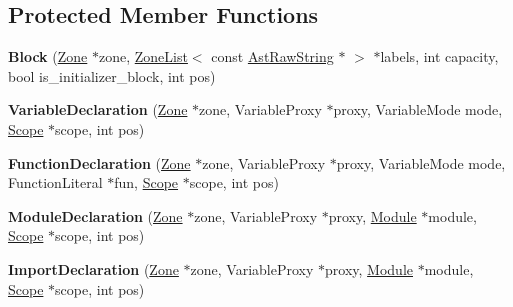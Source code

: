 \subsection*{Protected Member Functions}
\begin{DoxyCompactItemize}
\item 
\hypertarget{classv8_1_1internal_1_1_v8___f_i_n_a_l_acc7e400df298bd596cac6a4d9822c80e}{}{\bfseries Block} (\hyperlink{classv8_1_1internal_1_1_zone}{Zone} $\ast$zone, \hyperlink{classv8_1_1internal_1_1_zone_list}{Zone\+List}$<$ const \hyperlink{classv8_1_1internal_1_1_ast_raw_string}{Ast\+Raw\+String} $\ast$ $>$ $\ast$labels, int capacity, bool is\+\_\+initializer\+\_\+block, int pos)\label{classv8_1_1internal_1_1_v8___f_i_n_a_l_acc7e400df298bd596cac6a4d9822c80e}

\item 
\hypertarget{classv8_1_1internal_1_1_v8___f_i_n_a_l_a888518d28144f8c82fdc00d3b3196107}{}{\bfseries Variable\+Declaration} (\hyperlink{classv8_1_1internal_1_1_zone}{Zone} $\ast$zone, Variable\+Proxy $\ast$proxy, Variable\+Mode mode, \hyperlink{classv8_1_1internal_1_1_v8___f_i_n_a_l_1_1_scope}{Scope} $\ast$scope, int pos)\label{classv8_1_1internal_1_1_v8___f_i_n_a_l_a888518d28144f8c82fdc00d3b3196107}

\item 
\hypertarget{classv8_1_1internal_1_1_v8___f_i_n_a_l_aab1b086a344dc2765dda84f38d234d38}{}{\bfseries Function\+Declaration} (\hyperlink{classv8_1_1internal_1_1_zone}{Zone} $\ast$zone, Variable\+Proxy $\ast$proxy, Variable\+Mode mode, Function\+Literal $\ast$fun, \hyperlink{classv8_1_1internal_1_1_v8___f_i_n_a_l_1_1_scope}{Scope} $\ast$scope, int pos)\label{classv8_1_1internal_1_1_v8___f_i_n_a_l_aab1b086a344dc2765dda84f38d234d38}

\item 
\hypertarget{classv8_1_1internal_1_1_v8___f_i_n_a_l_a2512859facbe2b034555ece5187282f3}{}{\bfseries Module\+Declaration} (\hyperlink{classv8_1_1internal_1_1_zone}{Zone} $\ast$zone, Variable\+Proxy $\ast$proxy, \hyperlink{classv8_1_1internal_1_1_module}{Module} $\ast$module, \hyperlink{classv8_1_1internal_1_1_v8___f_i_n_a_l_1_1_scope}{Scope} $\ast$scope, int pos)\label{classv8_1_1internal_1_1_v8___f_i_n_a_l_a2512859facbe2b034555ece5187282f3}

\item 
\hypertarget{classv8_1_1internal_1_1_v8___f_i_n_a_l_a32c94cdc5e3bcc555d9e5fe50cc18c8e}{}{\bfseries Import\+Declaration} (\hyperlink{classv8_1_1internal_1_1_zone}{Zone} $\ast$zone, Variable\+Proxy $\ast$proxy, \hyperlink{classv8_1_1internal_1_1_module}{Module} $\ast$module, \hyperlink{classv8_1_1internal_1_1_v8___f_i_n_a_l_1_1_scope}{Scope} $\ast$scope, int pos)\label{classv8_1_1internal_1_1_v8___f_i_n_a_l_a32c94cdc5e3bcc555d9e5fe50cc18c8e}


\end{DoxyCompactItemize}
